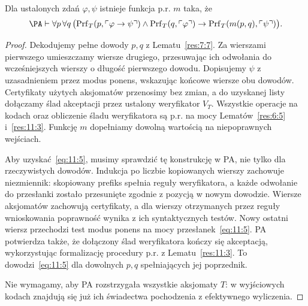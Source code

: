 \begin{lemat}\label{res:11:4}
Dla ustalonych zdań $\varphi,\psi$ istnieje funkcja p.r. $m$ taka, że
\begin{equation}\label{eq:11:5}
\PA\vdash\forall p\,\forall q\,\bigl(
\operatorname{Prf}_T(p,\ulcorner\varphi\to\psi\urcorner)
\land\operatorname{Prf}_T(q,\ulcorner\varphi\urcorner)
\to\operatorname{Prf}_T(m(p,q),\ulcorner\psi\urcorner)\bigr).
\end{equation}
\end{lemat}
\begin{proof}
Dekodujemy pełne dowody $p,q$ z Lematu~\ref{res:7:7}. Za wierszami pierwszego umieszczamy wiersze drugiego, przesuwając ich odwołania do wcześniejszych wierszy o długość pierwszego dowodu. Dopisujemy $\psi$ z uzasadnieniem przez modus ponens, wskazując końcowe wiersze obu dowodów. Certyfikaty użytych aksjomatów przenosimy bez zmian, a do uzyskanej listy dołączamy ślad akceptacji przez ustalony weryfikator $V_T$. Wszystkie operacje na kodach oraz obliczenie śladu weryfikatora są p.r. na mocy Lematów~\ref{res:6:5} i~\ref{res:11:3}. Funkcję $m$ dopełniamy dowolną wartością na niepoprawnych wejściach.

Aby uzyskać~\eqref{eq:11:5}, musimy sprawdzić tę konstrukcję w PA, nie tylko dla rzeczywistych dowodów. Indukcja po liczbie kopiowanych wierszy zachowuje niezmiennik: skopiowany prefiks spełnia reguły weryfikatora, a każde odwołanie do przesłanki zostało przesunięte zgodnie z pozycją w nowym dowodzie. Wiersze aksjomatów zachowują certyfikaty, a dla wierszy otrzymanych przez reguły wnioskowania poprawność wynika z ich syntaktycznych testów. Nowy ostatni wiersz przechodzi test modus ponens na mocy przesłanek~\eqref{eq:11:5}. PA potwierdza także, że dołączony ślad weryfikatora kończy się akceptacją, wykorzystując formalizację procedury p.r. z Lematu~\ref{res:11:3}. To dowodzi~\eqref{eq:11:5} dla dowolnych $p,q$ spełniających jej poprzednik.

Nie wymagamy, aby PA rozstrzygała wszystkie aksjomaty $T$: w wyjściowych kodach znajdują się już ich świadectwa pochodzenia z efektywnego wyliczenia.
\end{proof}

